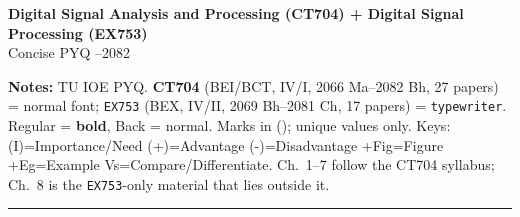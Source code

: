 \documentclass[10pt]{article}
\author{}
\date{}
\begin{document}
\begin{center}
  {\large\bfseries Digital Signal Analysis and Processing (CT704) + Digital Signal Processing (EX753)}\\[0.2em]
  {\normalsize Concise PYQ --2082}
\end{center}
\vspace{-0.4em}
\small
\textbf{Notes:} TU IOE PYQ. \textbf{CT704} (BEI/BCT, IV/I, 2066 Ma--2082 Bh, 27 papers) = normal font;
\texttt{EX753} (BEX, IV/II, 2069 Bh--2081 Ch, 17 papers) = \texttt{typewriter}.
Regular = \textbf{bold}, Back = normal. Marks in (); unique values only.
Keys: (I)=Importance/Need \quad (+)=Advantage \quad (-)=Disadvantage \quad +Fig=Figure \quad +Eg=Example \quad Vs=Compare/Differentiate.
Ch.\ 1--7 follow the CT704 syllabus; Ch.\ 8 is the \texttt{EX753}-only material that lies outside it.
\vspace{2pt}
\hrule
\vspace{4pt}
\end{document}
